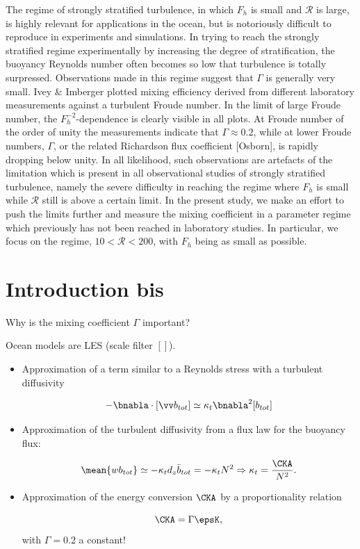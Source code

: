 The regime of strongly stratified turbulence, in which $ F_h $ is small and $
{\mathcal{R}} $ is large, is highly relevant for applications in the
ocean\citep[]{RileyDeBruynKops2003, Lindborg2006}, but is notoriously difficult
to reproduce in experiments and simulations. In trying to reach the strongly
stratified regime experimentally by increasing the degree of stratification,
the buoyancy Reynolds number often becomes so low that turbulence is totally
surpressed. Observations made in this regime suggest that $ \Gamma $ is
generally very small. Ivey \& Imberger \cite{IveyImberger1991} plotted mixing
efficiency derived from different laboratory measurements
\cite{Stillinger1983, Itsweire1986, Rohr1988, Lienhard1990} against a turbulent Froude
number. In the limit of large Froude number, the $ F_h^{-2} $-dependence is
clearly visible in all plots. At Froude number of the order of unity the
measurements indicate that $ \Gamma \approx 0.2 $, while at lower Froude
numbers, $ \Gamma $, or the related Richardson flux coefficient [Osborn], is
rapidly dropping below unity. In all likelihood, such observations are
artefacts of the limitation which is present in all observational studies of
strongly stratified turbulence, namely the severe difficulty in reaching the
regime where $ F_h $ is small while $ {\mathcal{R}} $ still is above a certain
limit. In the present study, we make an effort to push the limits further and
measure the mixing coefficient in a parameter regime which previously has not
been reached in laboratory studies. In particular, we focus on the regime, $ 10
< \mathcal{R} < 200 $, with $ F_h $ being as small as possible.


\section{Introduction bis}

Why is the mixing coefficient $\Gamma$ important?

Ocean models are LES (scale filter $[]$).

\begin{itemize}

\item Approximation of a term similar to a Reynolds stress with a turbulent diffusivity

$$- \bnabla \cdot [\vv b_{tot}] \simeq \kappa_t \bnabla^2 [b_{tot}] $$

\item Approximation of the turbulent diffusivity from a flux law for the buoyancy flux:

$$\mean{w b_{tot}} \simeq - \kappa_t d_z \bar b_{tot} = - \kappa_t N^2  \Rightarrow \kappa_t = \frac{\CKA}{N^2}.$$

\item  Approximation of the energy conversion $\CKA$ by a proportionality relation

$$ \CKA = \Gamma \epsK, $$
with $\Gamma = 0.2$ a constant!
\end{itemize}


